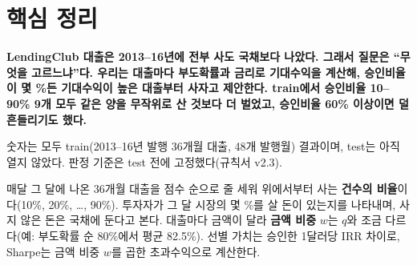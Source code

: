 \chapter*{핵심 정리}
\begingroup
\captionsetup{labelformat=empty}

\begin{keybox}[한 문장 결론]
\textbf{LendingClub 대출은 2013--16년에 전부 사도 국채보다 나았다. 그래서 질문은 ``무엇을 고르느냐''다. 우리는 대출마다 부도확률과 금리로 기대수익을 계산해, 승인비율이 몇 \%든 기대수익이 높은 대출부터 사자고 제안한다. train에서 승인비율 10--90\% 9개 모두 같은 양을 무작위로 산 것보다 더 벌었고, 승인비율 60\% 이상이면 덜 흔들리기도 했다.}
\end{keybox}
숫자는 모두 train(2013--16년 발행 36개월 대출, 48개 발행월) 결과이며, test는 아직 열지 않았다. 판정 기준은 test 전에 고정했다(규칙서 v2.3).

\begin{formulabox}[승인비율 $q$란]
매달 그 달에 나온 36개월 대출을 점수 순으로 줄 세워 위에서부터 사는 \textbf{건수의 비율}이다(10\%, 20\%, \dots, 90\%). 투자자가 그 달 시장의 몇 \%를 살 돈이 있는지를 나타내며, 사지 않은 돈은 국채에 둔다고 본다. 대출마다 금액이 달라 \textbf{금액 비중} $w$는 $q$와 조금 다르다(예: 부도확률 순 80\%에서 평균 82.5\%). 선별 가치는 승인한 1달러당 IRR 차이로, Sharpe는 금액 비중 $w$를 곱한 초과수익으로 계산한다.
\end{formulabox}

